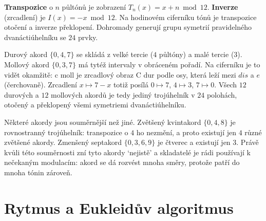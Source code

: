 \begin{definitionbox}
  \textbf{Transpozice} o $n$ půltónů je zobrazení $T_n(x) = x + n \bmod 12$. \textbf{Inverze} (zrcadlení) je $I(x) = -x \bmod 12$. Na hodinovém ciferníku tónů je transpozice otočení a inverze překlopení. Dohromady generují grupu symetrií pravidelného dvanáctiúhelníku se $24$ prvky.
\end{definitionbox}

\begin{center}
\end{center}

Durový akord $\{0, 4, 7\}$ se skládá z velké tercie ($4$ půltóny) a malé tercie ($3$). Mollový akord $\{0, 3, 7\}$ má tytéž intervaly v obráceném pořadí. Na ciferníku je to vidět okamžitě: c moll je zrcadlový obraz C dur podle osy, která leží mezi $dis$ a $e$ (čerchovaně). Zrcadlení $x\mapsto 7 - x$ totiž posílá $0\mapsto 7$, $4\mapsto 3$, $7\mapsto 0$. Všech $12$ durových a $12$ mollových akordů je tedy jediný trojúhelník v $24$ polohách, otočený a překlopený všemi symetriemi dvanáctiúhelníku.

Některé akordy jsou souměrnější než jiné. Zvětšený kvintakord $\{0, 4, 8\}$ je rovnostranný trojúhelník: transpozice o $4$ ho nezmění, a proto existují jen $4$ různé zvětšené akordy. Zmenšený septakord $\{0, 3, 6, 9\}$ je čtverec a existují jen $3$. Právě kvůli této souměrnosti zní tyto akordy `nejistě' a skladatelé je rádi používají k nečekaným modulacím: akord se dá rozvést mnoha směry, protože patří do mnoha tónin zároveň.

\section{Rytmus a Eukleidův algoritmus}

